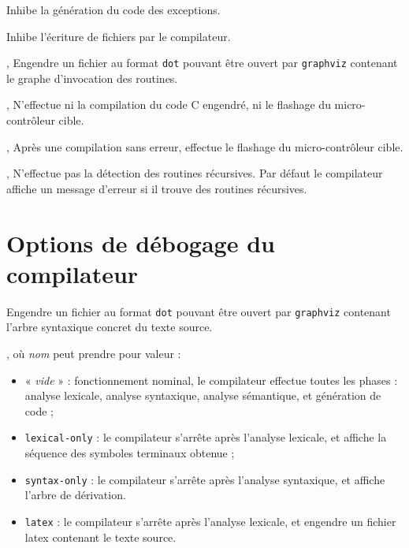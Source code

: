 
 Inhibe la génération du code des exceptions.



 Inhibe l'écriture de fichiers par le compilateur.


,  Engendre un fichier au format \texttt{dot} pouvant être ouvert par \texttt{graphviz} contenant le graphe d'invocation des routines.

,  N'effectue ni la compilation du code C engendré, ni le flashage du micro-contrôleur cible.


,  Après une compilation sans erreur, effectue le flashage du micro-contrôleur cible.


,  N'effectue pas la détection des routines récursives. Par défaut le compilateur affiche un message d'erreur si il trouve des routines récursives.






\section{Options de débogage du compilateur}


 Engendre un fichier au format \texttt{dot} pouvant être ouvert par \texttt{graphviz} contenant l'arbre syntaxique concret du texte source.


, où \emph{nom} peut prendre pour valeur :
\begin{itemize}
  \item « \emph{vide} » : fonctionnement nominal, le compilateur effectue toutes les phases : analyse lexicale, analyse syntaxique, analyse sémantique, et génération de code ;
  \item \texttt{lexical-only} : le compilateur s'arrête après l'analyse lexicale, et affiche la séquence des symboles terminaux obtenue ;
  \item \texttt{syntax-only} : le compilateur s'arrête après l'analyse syntaxique, et affiche l'arbre de dérivation.
  \item \texttt{latex} : le compilateur s'arrête après l'analyse lexicale, et engendre un fichier latex contenant le texte source.
\end{itemize}

